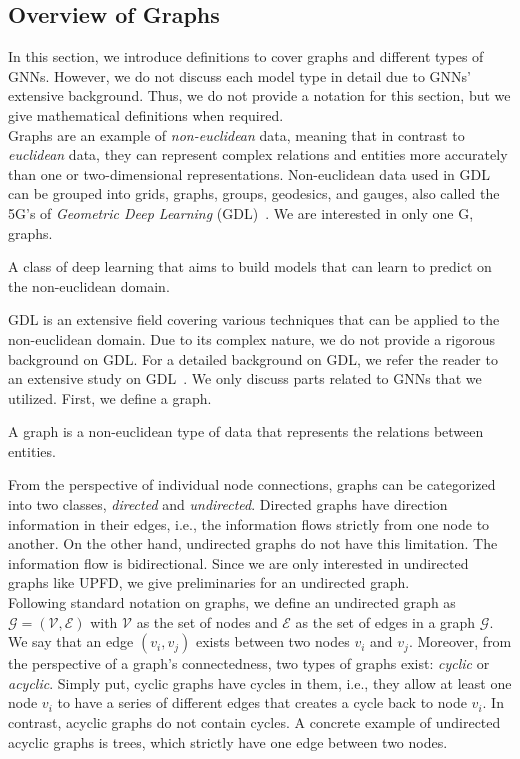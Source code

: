 \subsection{Overview of Graphs}
\label{subsec:mixedApproaches_OverviewOfGraphs}
In this section, we introduce definitions to cover graphs and different types of GNNs. However, we do not discuss each model type in detail due to GNNs' extensive background. Thus, we do not provide a notation for this section, but we give mathematical definitions when required.\\
Graphs are an example of \emph{non-euclidean} data, meaning that in contrast to \emph{euclidean} data, they can represent complex relations and entities more accurately than one or two-dimensional representations. Non-euclidean data used in GDL can be grouped into grids, graphs, groups, geodesics, and gauges, also called the 5G's of \emph{Geometric Deep Learning} (GDL)~\parencite{GeometricDeepLearning_Bronstein}. We are interested in only one G, graphs.
\begin{definition}
    A class of deep learning that aims to build models that can learn to predict on the non-euclidean domain.
\end{definition}
GDL is an extensive field covering various techniques that can be applied to the non-euclidean domain. Due to its complex nature, we do not provide a rigorous background on GDL. For a detailed background on GDL, we refer the reader to an extensive study on GDL~\parencite{GeometricDeepLearning_Bronstein}. We only discuss parts related to GNNs that we utilized. First, we define a graph.
\begin{definition}
    A graph is a non-euclidean type of data that represents the relations between entities.
\end{definition}
From the perspective of individual node connections, graphs can be categorized into two classes, \emph{directed} and \emph{undirected}. Directed graphs have direction information in their edges, i.e., the information flows strictly from one node to another. On the other hand, undirected graphs do not have this limitation. The information flow is bidirectional. Since we are only interested in undirected graphs like UPFD, we give preliminaries for an undirected graph.\\
Following standard notation on graphs, we define an undirected graph as $\mathcal{G} = (\mathcal{V}, \mathcal{E})$ with $\mathcal{V}$ as the set of nodes and $\mathcal{E}$ as the set of edges in a graph $\mathcal{G}$. We say that an edge $(v_i, v_j)$ exists between two nodes $v_i$ and $v_j$. Moreover, from the perspective of a graph's connectedness, two types of graphs exist: \emph{cyclic} or \emph{acyclic}. Simply put, cyclic graphs have cycles in them, i.e., they allow at least one node $v_i$ to have a series of different edges that creates a cycle back to node $v_i$. In contrast, acyclic graphs do not contain cycles. A concrete example of undirected acyclic graphs is trees, which strictly have one edge between two nodes.\\
